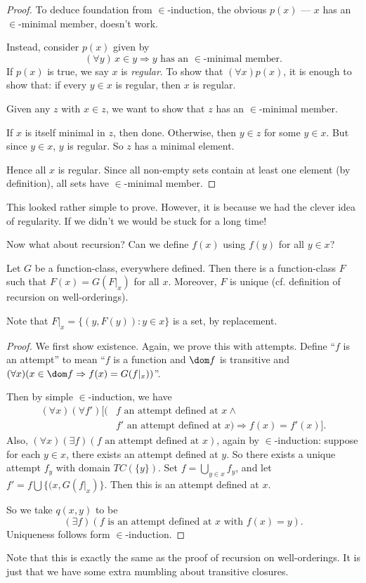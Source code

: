 \documentclass[a4paper]{article}
\begin{document}
\begin{proof}
  To deduce foundation from $\in$-induction, the obvious $p(x)$ --- $x$ has an $\in$-minimal member, doesn't work.

  Instead, consider $p(x)$ given by
  \[
    (\forall y)\,x\in y \Rightarrow y\text{ has an }\in\text{-minimal member}.
  \]
  If $p(x)$ is true, we say $x$ is \emph{regular}. To show that $(\forall x)p(x)$, it is enough to show that: if every $y\in x$ is regular, then $x$ is regular.

  Given any $z$ with $x\in z$, we want to show that $z$ has an $\in$-minimal member.

  If $x$ is itself minimal in $z$, then done. Otherwise, then $y\in z$ for some $y\in x$. But since $y\in x$, $y$ is regular. So $z$ has a minimal element.

  Hence all $x$ is regular. Since all non-empty sets contain at least one element (by definition), all sets have $\in$-minimal member.
\end{proof}
This looked rather simple to prove. However, it is because we had the clever idea of regularity. If we didn't we would be stuck for a long time!

Now what about recursion? Can we define $f(x)$ using $f(y)$ for all $y\in x$?

\begin{thm}
  Let $G$ be a function-class, everywhere defined. Then there is a function-class $F$ such that $F(x) = G(F|_x)$ for all $x$. Moreover, $F$ is unique (cf. definition of recursion on well-orderings).
\end{thm}
Note that $F|_x = \{(y, F(y)): y\in x\}$ is a set, by replacement.

\begin{proof}
  We first show existence. Again, we prove this with attempts. Define ``$f$ is an attempt'' to mean ``$f$ is a function and $\dom f$ is transitive and $(\forall x)(x\in \dom f \Rightarrow f(x) = G(f|_x))$''.

  Then by simple $\in$-induction, we have
  \begin{align*}
    (\forall x)(\forall f')[(&f\text{ an attempt defined at }x\wedge\\
    & f'\text{ an attempt defined at $x$}) \Rightarrow f(x) = f'(x)].
  \end{align*}
  Also, $(\forall x)(\exists f)(f\text{ an attempt defined at }x)$, again by $\in$-induction: suppose for each $y\in x$, there exists an attempt defined at $y$. So there exists a unique attempt $f_y$ with domain $TC(\{y\})$. Set $f = \bigcup_{y\in x}f_y$, and let $f' = f\bigcup \{(x, G(f|_x)\}$. Then this is an attempt defined at $x$.

  So we take $q(x, y)$ to be
  \[
    (\exists f)(f\text{ is an attempt defined at }x\text{ with }f(x) = y).
  \]
  Uniqueness follows form $\in$-induction.
\end{proof}
Note that this is exactly the same as the proof of recursion on well-orderings. It is just that we have some extra mumbling about transitive closures.
\end{document}
